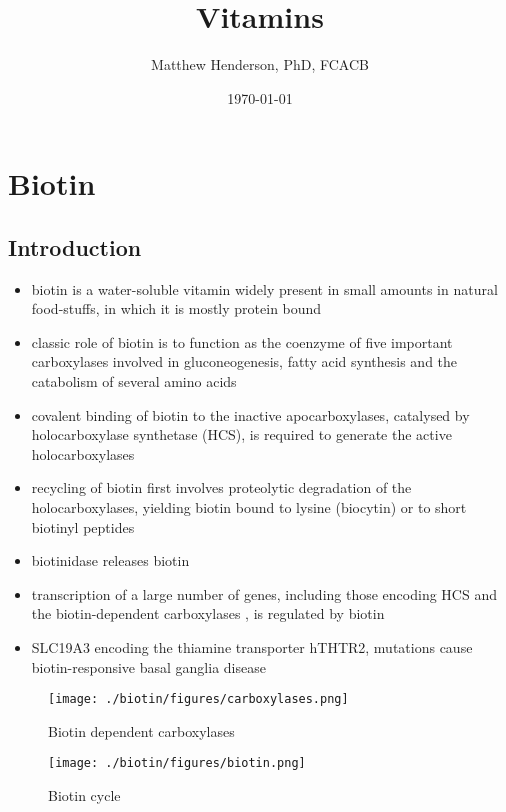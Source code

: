 \documentclass{scrartcl}
\author{Matthew Henderson, PhD, FCACB}
\date{\today}
\title{Vitamins}
\begin{document}
\maketitle
\setcounter{tocdepth}{2}
\tableofcontents


\section{Biotin}
\label{sec:org282ffbc}
\subsection{Introduction}
\label{sec:org6087398}
\begin{itemize}
\item biotin is a water-soluble vitamin widely present in small amounts in
natural food-stuffs, in which it is mostly protein bound
\item classic role of biotin is to function as the coenzyme of five
important carboxylases involved in gluconeogenesis, fatty acid
synthesis and the catabolism of several amino acids
\item covalent binding of biotin to the inactive apocarboxylases,
catalysed by holocarboxylase synthetase (HCS), is required to
generate the active holocarboxylases
\item recycling of biotin first involves proteolytic degradation of the
holocarboxylases, yielding biotin bound to lysine (biocytin) or to
short biotinyl peptides
\item biotinidase releases biotin
\item transcription of a large number of genes, including those encoding
HCS and the biotin-dependent carboxylases , is regulated by biotin
\item SLC19A3 encoding the thiamine transporter hTHTR2, mutations cause
biotin-responsive basal ganglia disease
\end{itemize}

\begin{figure}[htbp]
\centering
\texttt{[image: ./biotin/figures/carboxylases.png]}
\caption{\label{fig:org914032a}
Biotin dependent carboxylases}
\end{figure}


\begin{figure}[htbp]
\centering
\texttt{[image: ./biotin/figures/biotin.png]}
\caption{\label{fig:org5e72cb7}
Biotin cycle}
\end{figure}
\end{document}
